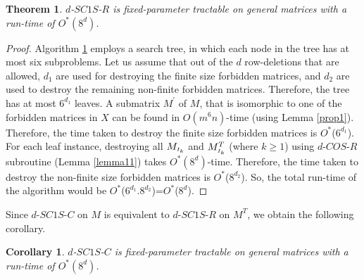 \documentclass[review, 1p]{elsarticle}
\newtheorem{theorem}{Theorem}
\newtheorem{corollary}{Corollary}
\begin{document}
\begin{theorem}\label{thmr}
$d$-$SC1S$-$R$ is fixed-parameter tractable on general matrices with a run-time of $O^{*}(8^{d})$. 
\end{theorem}
\begin{proof}
Algorithm \hyperref[alg5]{1} employs a search tree, in which each node in the tree has at most six subproblems. Let us assume that out of the $d$ row-deletions that are allowed, $d_1$ are used for destroying the finite size forbidden matrices, and $d_2$ are used to destroy the remaining non-finite forbidden matrices. Therefore, the tree has at most $6^{d_{1}}$ leaves. A submatrix $M^{'}$ of $M$, that is isomorphic to one of the forbidden matrices in $X$ can be found in $O(m^{6}n)$-time (using Lemma \ref{prop1}). Therefore, the time taken to destroy the finite size forbidden matrices is $O^{*}$($6^{d_1}$). For each leaf instance, destroying all $M_{\mathsmaller I_{k}}$ and $M^{T}_{\mathsmaller{I_{k}}}$ (where $k \geq 1$) using $d$-$COS$-$R$ subroutine (Lemma \ref{lemma11}) takes $O^{*}(8^{d})$-time.    Therefore, the time taken to destroy the non-finite size forbidden matrices is $O^{*}$($8^{d_2}$). So, the total run-time of the algorithm would be $O^{*}$($6^{d_1}$.$8^{d_2}$)=$O^{*}$($8^d$).
\end{proof}
\noindent Since $d$-$SC1S$-$C$ on $M$ is equivalent to $d$-$SC1S$-$R$ on $M^{T}$, we obtain the following corollary.
\begin{corollary}
$d$-$SC1S$-$C$ is fixed-parameter tractable on general matrices with a run-time of $O^{*}(8^{d})$.
\end{corollary} 
\end{document}
